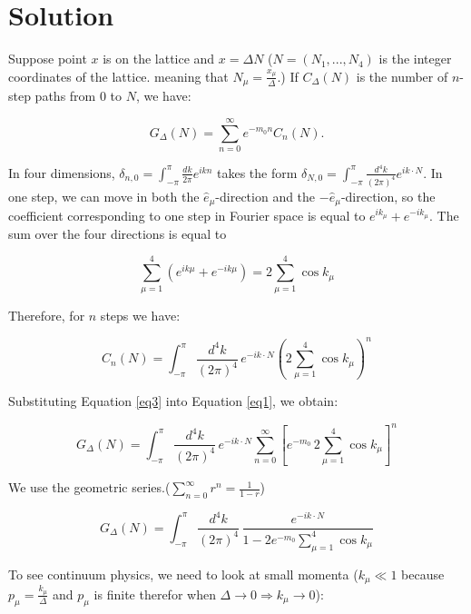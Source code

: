 \documentclass[12pt]{report}
\begin{document}
\section*{Solution}
Suppose point $x$ is on the lattice and $x=\Delta N$ ($N=(N_1,...,N_4)$ is the integer coordinates of the lattice. meaning that $N_\mu=\frac{x_\mu}{\Delta}$.) If \(C_\Delta(N)\) is the number of \(n\)-step paths from \(0\) to \(N\), we have:

\begin{equation}
G_\Delta(N) = \sum_{n=0}^{\infty} e^{-m_0 n} C_n(N).
\label{eq1}
\end{equation}

In four dimensions, $\delta_{n,0} = \int_{-\pi}^{\pi} \frac{dk}{2\pi} e^{ikn}$ takes the form $\delta_{N,0} = \int_{-\pi}^{\pi} \frac{d^4k}{(2\pi)^4} e^{ik \cdot N}$. In one step, we can move in both the \(\hat{e}_\mu\)-direction and the \(-\hat{e}_\mu\)-direction, so the coefficient corresponding to one step in Fourier space is equal to \(e^{ik_\mu} + e^{-ik_\mu} \). The sum over the four directions is equal to

\begin{equation}
\sum_{\mu=1}^{4} \left( e^{i k \mu} + e^{-i k \mu} \right) = 2 \sum_{\mu=1}^{4} \cos k_\mu
\label{eq2}
\end{equation}

Therefore, for \(n\) steps we have:

\begin{equation}
C_n(N) = \int_{-\pi}^{\pi} \frac{d^4 k}{(2\pi)^4}\,
e^{-i k \cdot N}
\left( 2 \sum_{\mu=1}^{4} \cos k_\mu \right)^n
\label{eq3}
\end{equation}

Substituting Equation \eqref{eq3} into Equation \eqref{eq1}, we obtain:

\begin{equation}
G_\Delta(N)
=
\int_{-\pi}^{\pi}
\frac{d^4k}{(2\pi)^4}\,
e^{-i k\cdot N}
\sum_{n=0}^{\infty}
\left[
e^{-m_0}\,
2 \sum_{\mu=1}^{4} \cos k_\mu
\right]^n
\label{eq4}
\end{equation}

We use the geometric series.($\sum_{n=0}^{\infty} r^n = \frac{1}{1-r}$)

\begin{equation}
G_\Delta(N)
=
\int_{-\pi}^{\pi}
\frac{d^4 k}{(2\pi)^4}\,
\frac{e^{-i k\cdot N}}
{1 - 2 e^{-m_0} \sum_{\mu=1}^{4} \cos k_\mu}
\label{eq5}
\end{equation}

To see continuum physics, we need to look at small momenta (\(k_\mu \ll 1\) because $p_\mu=\frac{k_\mu}{\Delta}$ and $p_\mu$ is finite therefor when $ \Delta \rightarrow 0 \Rightarrow k_\mu  \rightarrow 0$):
\end{document}
